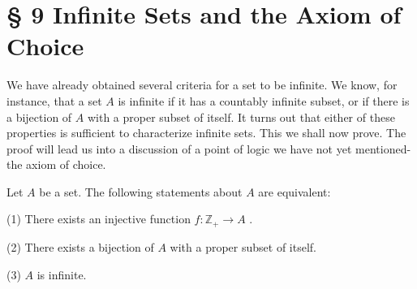 \section*{§ 9 Infinite Sets and the Axiom of Choice}

We have already obtained several criteria for a set to be infinite. We know, for instance, that a set \(A\) is infinite if it has a countably infinite subset, or if there is a bijection of \(A\) with a proper subset of itself. It turns out that either of these properties is sufficient to characterize infinite sets. This we shall now prove. The proof will lead us into a discussion of a point of logic we have not yet mentioned-the axiom of choice.

\begin{theorem} 
Let \(A\) be a set. The following statements about \(A\) are equivalent:

(1) There exists an injective function \(f : {\mathbb{Z}}_{ + } \rightarrow  A\) .

(2) There exists a bijection of \(A\) with a proper subset of itself.

(3) \(A\) is infinite.
\end{theorem}

